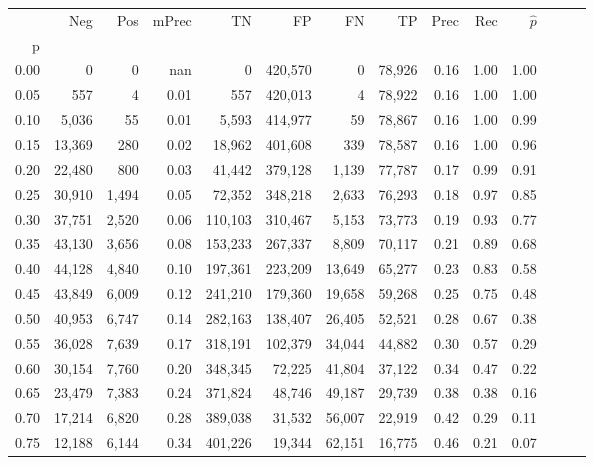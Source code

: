 \begin{tabular}{rrrrrrrrrrrrrr}
\toprule
{} &     Neg &    Pos & mPrec &       TN &       FP &      FN &      TP &  Prec &   Rec & $\hat{p}$ \\
p    &         &        &       &          &          &         &         &       &       &           \\
\midrule
0.00 &       0 &      0 &   nan &        0 &  420,570 &       0 &  78,926 &  0.16 &  1.00 &      1.00 \\
0.05 &     557 &      4 &  0.01 &      557 &  420,013 &       4 &  78,922 &  0.16 &  1.00 &      1.00 \\
0.10 &   5,036 &     55 &  0.01 &    5,593 &  414,977 &      59 &  78,867 &  0.16 &  1.00 &      0.99 \\
0.15 &  13,369 &    280 &  0.02 &   18,962 &  401,608 &     339 &  78,587 &  0.16 &  1.00 &      0.96 \\
0.20 &  22,480 &    800 &  0.03 &   41,442 &  379,128 &   1,139 &  77,787 &  0.17 &  0.99 &      0.91 \\
0.25 &  30,910 &  1,494 &  0.05 &   72,352 &  348,218 &   2,633 &  76,293 &  0.18 &  0.97 &      0.85 \\
0.30 &  37,751 &  2,520 &  0.06 &  110,103 &  310,467 &   5,153 &  73,773 &  0.19 &  0.93 &      0.77 \\
0.35 &  43,130 &  3,656 &  0.08 &  153,233 &  267,337 &   8,809 &  70,117 &  0.21 &  0.89 &      0.68 \\
0.40 &  44,128 &  4,840 &  0.10 &  197,361 &  223,209 &  13,649 &  65,277 &  0.23 &  0.83 &      0.58 \\
0.45 &  43,849 &  6,009 &  0.12 &  241,210 &  179,360 &  19,658 &  59,268 &  0.25 &  0.75 &      0.48 \\
0.50 &  40,953 &  6,747 &  0.14 &  282,163 &  138,407 &  26,405 &  52,521 &  0.28 &  0.67 &      0.38 \\
0.55 &  36,028 &  7,639 &  0.17 &  318,191 &  102,379 &  34,044 &  44,882 &  0.30 &  0.57 &      0.29 \\
0.60 &  30,154 &  7,760 &  0.20 &  348,345 &   72,225 &  41,804 &  37,122 &  0.34 &  0.47 &      0.22 \\
0.65 &  23,479 &  7,383 &  0.24 &  371,824 &   48,746 &  49,187 &  29,739 &  0.38 &  0.38 &      0.16 \\
0.70 &  17,214 &  6,820 &  0.28 &  389,038 &   31,532 &  56,007 &  22,919 &  0.42 &  0.29 &      0.11 \\
0.75 &  12,188 &  6,144 &  0.34 &  401,226 &   19,344 &  62,151 &  16,775 &  0.46 &  0.21 &      0.07 \\

\end{tabular}
